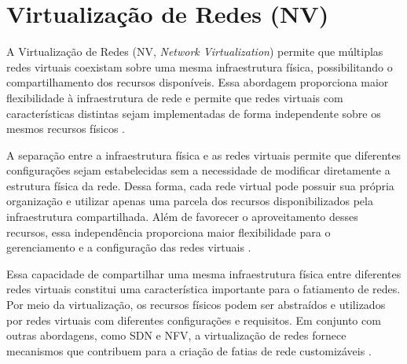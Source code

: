 \section{Virtualização de Redes (NV)}

A Virtualização de Redes (NV, \textit{Network Virtualization}) permite que múltiplas redes virtuais coexistam sobre uma mesma infraestrutura física, possibilitando o compartilhamento dos recursos disponíveis. Essa abordagem proporciona maior flexibilidade à infraestrutura de rede e permite que redes virtuais com características distintas sejam implementadas de forma independente sobre os mesmos recursos físicos \cite{chowdhury2010survey}.

A separação entre a infraestrutura física e as redes virtuais permite que diferentes configurações sejam estabelecidas sem a necessidade de modificar diretamente a estrutura física da rede. Dessa forma, cada rede virtual pode possuir sua própria organização e utilizar apenas uma parcela dos recursos disponibilizados pela infraestrutura compartilhada. Além de favorecer o aproveitamento desses recursos, essa independência proporciona maior flexibilidade para o gerenciamento e a configuração das redes virtuais \cite{chowdhury2010survey}.

Essa capacidade de compartilhar uma mesma infraestrutura física entre diferentes redes virtuais constitui uma característica importante para o fatiamento de redes. Por meio da virtualização, os recursos físicos podem ser abstraídos e utilizados por redes virtuais com diferentes configurações e requisitos. Em conjunto com outras abordagens, como SDN e NFV, a virtualização de redes fornece mecanismos que contribuem para a criação de fatias de rede customizáveis \cite{gomes2020strategies}.
